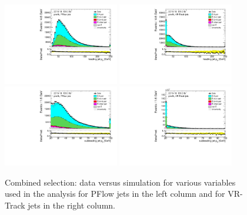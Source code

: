 \documentclass[letterpaper,12pt]{article}
\begin{document}
\begin{figure}[!h]
		\centering
		\includegraphics[width=0.45\textwidth]{FTAG_plots/pretagNoRwwithhighpTPFlowall/DataMC_h_J0_pt.pdf}
		\includegraphics[width=0.45\textwidth]{FTAG_plots/pretagNoRwwithhighpTVRJetsall/DataMC_h_J0_pttrackjet.pdf}\\
		\includegraphics[width=0.45\textwidth]{FTAG_plots/pretagNoRwwithhighpTPFlowall/DataMC_h_J1_pt.pdf}
		\includegraphics[width=0.45\textwidth]{FTAG_plots/pretagNoRwwithhighpTVRJetsall/DataMC_h_J1_pttrackjet.pdf}\\
		\caption{Combined selection: data versus simulation for various variables used in the analysis for 
		PFlow jets in the left column and for VR-Track jets in the right column.}
		\label{fig:kinematic_distributions_combined}
\end{figure}
		
\end{document}
